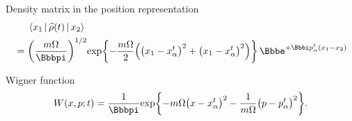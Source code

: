 \begin{nameddef}{Density matrix in the position representation}
\begin{align}
&\phantom{{}={}} \Braket{x_1 | \rfun{\widehat{\rho}}{t} | x_2} \nonumber \\
&= \rbr{\frac{m\Omega}{\pp}}^{1/2} \cfun{\exp}{-\frac{m\Omega}{2}\rbr{\rbr{
x_1-x_\alpha^t}^2 + \rbr{x_1-x_\alpha^t}^2}}\,
\ee^{+\ii p_\alpha^t\rbr{x_1-x_2}}
\end{align}
\end{nameddef} %

\begin{nameddef}{Wigner function}
\begin{equation}
\rfun{W}{x, p; t} = \frac{1}{\pp} \cfun{\exp}{-m\Omega \rbr{x-x_\alpha^t}^2
-\frac{1}{m\Omega}\rbr{p-p_\alpha^t}^2}.
\end{equation}
\end{nameddef} %

